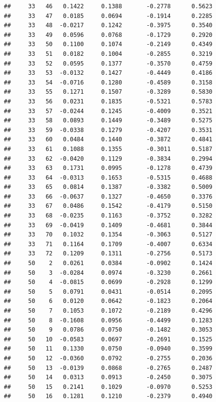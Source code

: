\documentclass[
]{article}
\begin{document}
\begin{verbatim}
##     33   46   0.1422     0.1388       -0.2778      0.5623  
##     33   47   0.0185     0.0694       -0.1914      0.2285  
##     33   48  -0.0217     0.1242       -0.3975      0.3540  
##     33   49   0.0596     0.0768       -0.1729      0.2920  
##     33   50   0.1100     0.1074       -0.2149      0.4349  
##     33   51   0.0182     0.1004       -0.2855      0.3219  
##     33   52   0.0595     0.1377       -0.3570      0.4759  
##     33   53  -0.0132     0.1427       -0.4449      0.4186  
##     33   54  -0.0716     0.1280       -0.4589      0.3158  
##     33   55   0.1271     0.1507       -0.3289      0.5830  
##     33   56   0.0231     0.1835       -0.5321      0.5783  
##     33   57  -0.0244     0.1245       -0.4009      0.3521  
##     33   58   0.0893     0.1449       -0.3489      0.5275  
##     33   59  -0.0338     0.1279       -0.4207      0.3531  
##     33   60   0.0484     0.1440       -0.3872      0.4841  
##     33   61   0.1088     0.1355       -0.3011      0.5187  
##     33   62  -0.0420     0.1129       -0.3834      0.2994  
##     33   63   0.1731     0.0995       -0.1278      0.4739  
##     33   64  -0.0313     0.1653       -0.5315      0.4688  
##     33   65   0.0814     0.1387       -0.3382      0.5009  
##     33   66  -0.0637     0.1327       -0.4650      0.3376  
##     33   67   0.0486     0.1542       -0.4179      0.5150  
##     33   68  -0.0235     0.1163       -0.3752      0.3282  
##     33   69  -0.0419     0.1409       -0.4681      0.3844  
##     33   70   0.1032     0.1354       -0.3063      0.5127  
##     33   71   0.1164     0.1709       -0.4007      0.6334  
##     33   72   0.1209     0.1311       -0.2756      0.5173  
##     50    2   0.0261     0.0384       -0.0902      0.1424  
##     50    3  -0.0284     0.0974       -0.3230      0.2661  
##     50    4  -0.0815     0.0699       -0.2928      0.1299  
##     50    5   0.0791     0.0431       -0.0514      0.2095  
##     50    6   0.0120     0.0642       -0.1823      0.2064  
##     50    7   0.1053     0.1072       -0.2189      0.4296  
##     50    8  -0.1608     0.0956       -0.4499      0.1283  
##     50    9   0.0786     0.0750       -0.1482      0.3053  
##     50   10  -0.0583     0.0697       -0.2691      0.1525  
##     50   11   0.1330     0.0750       -0.0940      0.3599  
##     50   12  -0.0360     0.0792       -0.2755      0.2036  
##     50   13  -0.0139     0.0868       -0.2765      0.2487  
##     50   14   0.0313     0.0913       -0.2450      0.3075  
##     50   15   0.2141     0.1029       -0.0970      0.5253  
##     50   16   0.1281     0.1210       -0.2379      0.4940  

\end{verbatim}
\end{document}
